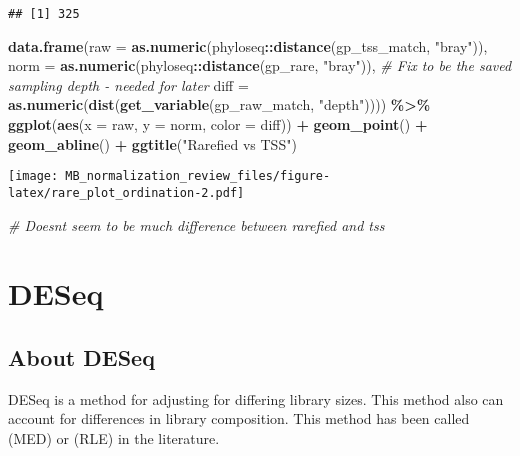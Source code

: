 \documentclass[
]{book}
\newenvironment{Shaded}{\begin{snugshade}}{\end{snugshade}}
\newcommand{\CommentTok}[1]{\textcolor[rgb]{0.56,0.35,0.01}{\textit{#1}}}
\newcommand{\DataTypeTok}[1]{\textcolor[rgb]{0.13,0.29,0.53}{#1}}
\newcommand{\KeywordTok}[1]{\textcolor[rgb]{0.13,0.29,0.53}{\textbf{#1}}}
\newcommand{\NormalTok}[1]{#1}
\newcommand{\OperatorTok}[1]{\textcolor[rgb]{0.81,0.36,0.00}{\textbf{#1}}}
\newcommand{\StringTok}[1]{\textcolor[rgb]{0.31,0.60,0.02}{#1}}
\begin{document}
\begin{verbatim}
## [1] 325
\end{verbatim}

\begin{Shaded}
\begin{Highlighting}[]
\KeywordTok{data.frame}\NormalTok{(}\DataTypeTok{raw =} \KeywordTok{as.numeric}\NormalTok{(phyloseq}\OperatorTok{::}\KeywordTok{distance}\NormalTok{(gp\_tss\_match, }\StringTok{"bray"}\NormalTok{)), }
           \DataTypeTok{norm =} \KeywordTok{as.numeric}\NormalTok{(phyloseq}\OperatorTok{::}\KeywordTok{distance}\NormalTok{(gp\_rare, }\StringTok{"bray"}\NormalTok{)), }
           \CommentTok{\# Fix to be the saved sampling depth {-} needed for later}
           \DataTypeTok{diff =} \KeywordTok{as.numeric}\NormalTok{(}\KeywordTok{dist}\NormalTok{(}\KeywordTok{get\_variable}\NormalTok{(gp\_raw\_match, }\StringTok{"depth"}\NormalTok{)))) }\OperatorTok{\%\textgreater{}\%}\StringTok{ }
\StringTok{    }\KeywordTok{ggplot}\NormalTok{(}\KeywordTok{aes}\NormalTok{(}\DataTypeTok{x =}\NormalTok{ raw, }\DataTypeTok{y =}\NormalTok{ norm, }\DataTypeTok{color =}\NormalTok{ diff)) }\OperatorTok{+}\StringTok{ }
\StringTok{        }\KeywordTok{geom\_point}\NormalTok{() }\OperatorTok{+}\StringTok{ }
\StringTok{        }\KeywordTok{geom\_abline}\NormalTok{() }\OperatorTok{+}
\StringTok{    }\KeywordTok{ggtitle}\NormalTok{(}\StringTok{"Rarefied vs TSS"}\NormalTok{)}
\end{Highlighting}
\end{Shaded}

\texttt{[image: MB\_normalization\_review\_files/figure-latex/rare\_plot\_ordination-2.pdf]}

\begin{Shaded}
\begin{Highlighting}[]
\CommentTok{\# Doesnt seem to be much difference between rarefied and tss}
\end{Highlighting}
\end{Shaded}

\hypertarget{deseq}{%
\chapter{DESeq}\label{deseq}}

\hypertarget{about-deseq}{%
\section{About DESeq}\label{about-deseq}}

DESeq is a method for adjusting for differing library sizes. This method also can account for differences in library composition. This method has been called (MED) or (RLE) in the literature.
\end{document}
